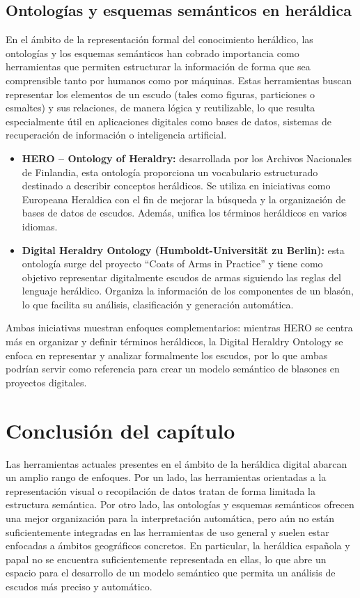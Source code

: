 \subsection{Ontologías y esquemas semánticos en heráldica}
En el ámbito de la representación formal del conocimiento heráldico, las ontologías y los esquemas 
semánticos han cobrado importancia como herramientas que permiten estructurar la información de
forma que sea comprensible tanto por humanos como por máquinas. Estas herramientas buscan representar
los elementos de un escudo (tales como figuras, particiones o esmaltes) y sus relaciones, de manera
lógica y reutilizable, lo que resulta especialmente útil en aplicaciones digitales como bases de 
datos, sistemas de recuperación de información o inteligencia artificial.

\begin{itemize}
    \item \textbf{HERO – Ontology of Heraldry:} desarrollada por los Archivos Nacionales de Finlandia, 
    esta ontología proporciona un vocabulario estructurado destinado a describir conceptos heráldicos.
    Se utiliza en iniciativas como Europeana Heraldica con el fin de mejorar la búsqueda y la organización
    de bases de datos de escudos. Además, unifica los términos heráldicos en varios idiomas.
    \item \textbf{Digital Heraldry Ontology (Humboldt-Universität zu Berlin):} esta ontología surge del
    proyecto “Coats of Arms in Practice” y tiene como objetivo representar digitalmente escudos de armas
    siguiendo las reglas del lenguaje heráldico. Organiza la información de los componentes de un blasón,
    lo que facilita su análisis, clasificación y generación automática.
\end{itemize}

Ambas iniciativas muestran enfoques complementarios: mientras HERO se centra más en organizar y
definir términos heráldicos, la Digital Heraldry Ontology se enfoca en representar y analizar
formalmente los escudos, por lo que ambas podrían servir como referencia para crear un modelo
semántico de blasones en proyectos digitales. 

\section{Conclusión del capítulo}
Las herramientas actuales presentes en el ámbito de la heráldica digital abarcan un amplio
rango de enfoques. Por un lado, las herramientas orientadas a la representación visual o
recopilación de datos tratan de forma limitada la estructura semántica. Por otro lado,
las ontologías y esquemas semánticos ofrecen una mejor organización para la interpretación
automática, pero aún no están suficientemente integradas en las herramientas de uso general y
suelen estar enfocadas a ámbitos geográficos concretos. En particular, la heráldica española y papal
no se encuentra suficientemente representada en ellas, lo que abre un espacio para el desarrollo
de un modelo semántico que permita un análisis de escudos más preciso y automático.